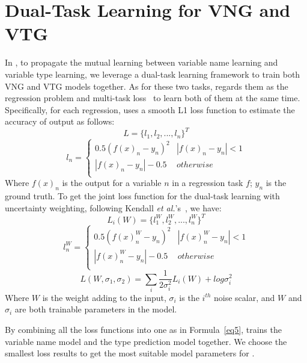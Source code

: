 \section{Dual-Task Learning for VNG and VTG}
\label{sec:dual}

In {\tool}, to propagate the mutual learning between
variable name learning and variable type learning,
we leverage a dual-task learning framework to
train both VNG and VTG models together.
As for these two tasks, {\tool} regards them as the regression
problem and multi-task loss~\cite{kendall2018multi} to learn both of
them at the same time. Specifically, for each regression, \tool uses a
smooth L1 loss function to estimate the accuracy of output as follows:
\begin{equation}\label{eq1}
L = \{l_1, l_2, ..., l_n\}^T
\end{equation}
\begin{equation}\label{eq2}
l_n = \left\{ 
	\begin{array}{lr}
    	0.5(f(x)_n-y_n)^2  & |f(x)_n-y_n|<1 \\
   	    |f(x)_n-y_n|-0.5   & otherwise   \\
	\end{array}
\right.
\end{equation}
Where $f(x)_n$ is the output for a variable $n$ in a regression task
$f$; $y_n$ is the ground truth. To get the joint loss function for the
dual-task learning with uncertainty weighting, following Kendall {\em
  et al.}'s~\cite{kendall2018multi}, we have:
\begin{equation}\label{eq3}
L_i(W) = \{l_1^W, l_2^W, ..., l_n^W\}^T
\end{equation}
\begin{equation}\label{eq4}
l_n^W = \left\{ 
	\begin{array}{lr}
		0.5(f(x)^W_n-y_n)^2  & |f(x)^W_n-y_n|<1 \\
		|f(x)^W_n-y_n|-0.5   & otherwise   \\
	\end{array}
\right.
\end{equation}
\begin{equation}\label{eq5}
L(W, \sigma_1, \sigma_2) = \sum_i\frac{1}{2\sigma_i^2}L_i(W) + log \sigma^2_i
\end{equation}
Where $W$ is the weight adding to the input, $\sigma_i$ is the $i^{th}$ noise scalar, and $W$ and $\sigma_i$ are both trainable parameters in the model.

By combining all the loss functions into one as in Formula~\ref{eq5},
{\tool} trains the variable name model and the type prediction model
together. We choose the smallest loss results to get the most suitable
model parameters for {\tool}.

